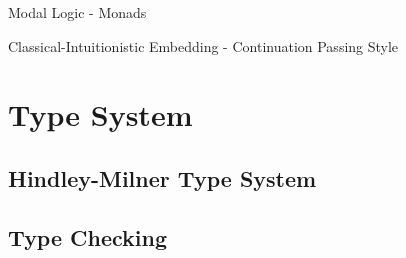 Modal Logic - Monads

Classical-Intuitionistic Embedding - Continuation Passing Style



\section{Type System}\label{sec:type_system}

\subsection{Hindley-Milner Type System}\label{sec:hindley_milner}

\subsection{Type Checking}\label{sec:type_checking}
